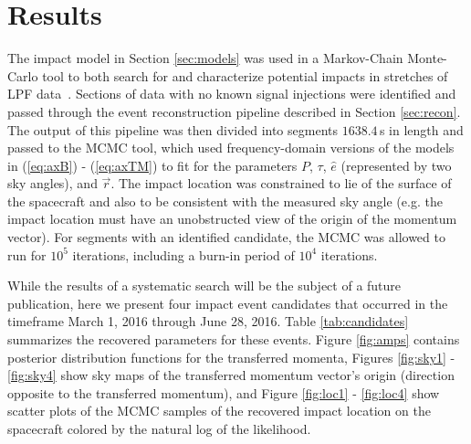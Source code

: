 \documentclass[a4paper]{jpconf}
\begin{document}
\section{Results}
\label{sec:results}

The impact model in Section \ref{sec:models} was used in a Markov-Chain Monte-Carlo tool to both search for and characterize potential impacts in stretches of LPF data~\cite{Cornish15,Littenberg15}. Sections of data with no known signal injections were identified and passed through the event reconstruction pipeline described in Section \ref{sec:recon}.  The output of this pipeline was then divided into segments $1638.4\,$s in length and passed to the MCMC tool, which used frequency-domain versions of the models in (\ref{eq:axB}) - (\ref{eq:axTM}) to fit for the parameters $P$, $\tau$, $\hat{e}$ (represented by two sky angles), and $\vec{r}$. The impact location was constrained to lie of the surface of the spacecraft and also to be consistent with the measured sky angle (e.g. the impact location must have an unobstructed view of the origin of the momentum vector). For segments with an identified candidate, the MCMC was allowed to run for $10^5$ iterations, including a burn-in period of $10^4$ iterations.
\par

While the results of a systematic search will be the subject of a future publication, here we present four impact event candidates that occurred in the timeframe March 1, 2016 through June 28, 2016. Table \ref{tab:candidates} summarizes the recovered parameters for these events. Figure \ref{fig:amps} contains posterior distribution functions for the transferred momenta, Figures \ref{fig:sky1} - \ref{fig:sky4} show sky maps of the transferred momentum vector's origin (direction opposite to the transferred momentum), and Figure \ref{fig:loc1} - \ref{fig:loc4} show scatter plots of the MCMC samples of the recovered impact location on the spacecraft colored by the natural log of the likelihood.
\end{document}
